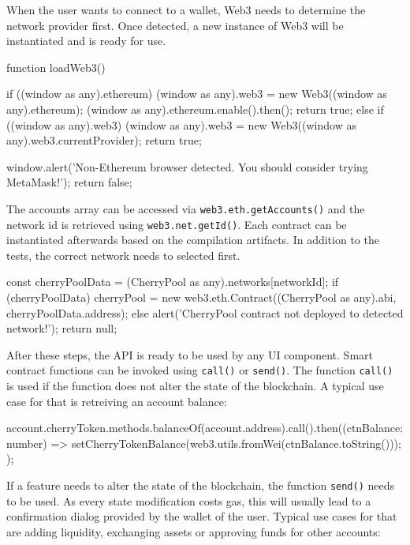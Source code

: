 When the user wants to connect to a wallet, Web3 needs to determine the network provider first. Once detected, a new instance of Web3 will be instantiated and is ready for use.

\begin{GenericCode}
function loadWeb3() {
  if ((window as any).ethereum) {
    (window as any).web3 = new Web3((window as any).ethereum);
    (window as any).ethereum.enable().then();
    return true;
  } else if ((window as any).web3) {
    (window as any).web3 = new Web3((window as any).web3.currentProvider);
    return true;
  }

  window.alert('Non-Ethereum browser detected. You should consider trying MetaMask!');
  return false;
}	
\end{GenericCode}

The accounts array can be accessed via \texttt{web3.eth.getAccounts()} and the network id is retrieved using \texttt{web3.net.getId()}. Each contract can be instantiated afterwards based on the compilation artifacts. In addition to the tests, the correct network needs to selected first.

\begin{GenericCode}
const cherryPoolData = (CherryPool as any).networks[networkId];
if (cherryPoolData) {
  cherryPool = new web3.eth.Contract((CherryPool as any).abi, cherryPoolData.address);
} else {
  alert('CherryPool contract not deployed to detected network!');
  return null;
}	
\end{GenericCode}

After these steps, the API is ready to be used by any UI component. Smart contract functions can be invoked using \texttt{call()} or \texttt{send()}. The function \texttt{call()} is used if the function does not alter the state of the blockchain. A typical use case for that is retreiving an account balance:

\begin{GenericCode}
account.cherryToken.methods.balanceOf(account.address).call().then((ctnBalance: number) => {
  setCherryTokenBalance(web3.utils.fromWei(ctnBalance.toString()));
});
          
\end{GenericCode}

If a feature needs to alter the state of the blockchain, the function \texttt{send()} needs to be used. As every state modification costs gas, this will usually lead to a confirmation dialog provided by the wallet of the user. Typical use cases for that are adding liquidity, exchanging assets or approving funds for other accounts:

